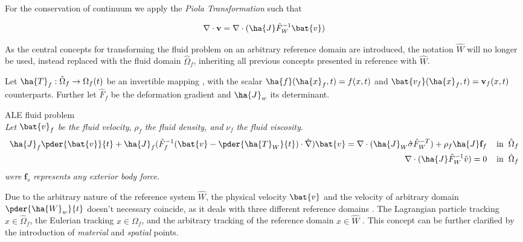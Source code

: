 For the conservation of continuum we apply the \textit{Piola Transformation} \cite{Richter2016}such that

\begin{align}
\nabla \cdot \mathbf{v} = \nabla \cdot (\ha{J} \hat{F}_W^{-1} \bat{v})
\end{align}

As the central concepts for transforming the fluid problem on an arbitrary reference domain are introduced, the notation $\hat{W}$ will no longer be used, instead replaced with the fluid domain $\hat{\Omega}_f$, inheriting all previous concepts presented in reference with $\hat{W}$.

 Let $\ha{T}_f : \hat{\Omega}_f \rightarrow \Omega_f (t)$ be an  invertible mapping , with the scalar $\ha{f}(\ha{x}_f, t) = f(x,t) $ and $\bat{v_f}(\ha{x}_f, t) = \mathbf{v}_f (x,t) $ counterparts. Further let $\hat{F}_f$ be the deformation gradient and  $\ha{J}_w$ its determinant.

\begin{equat}
ALE fluid problem \\ 
\textit{Let } $\bat{v}_f$ \textit{be the fluid velocity}, $\rho_f$  \textit{the fluid density, and }  $\nu_f$  \textit{the fluid viscosity}.
\begin{align}
\ha{J}_f \pder{\bat{v}}{t} + \ha{J}_f (\hat{F}_f^{-1}(\bat{v} - \pder{\ha{T}_W}{t}) \cdot \hat{\nabla}) \bat{v}
= \nabla \cdot (\ha{J}_W \hat{\sigma}\hat{F}_W^{-T}) + \rho_f \ha{J} \mathbf{f}_f
\hspace{4mm} \text{in} \hspace{2mm} \hat{\Omega}_f \\
\nabla \cdot (\ha{J} \hat{F}_W^{-1} \hat{v}) = 0 \hspace{4mm} \text{in} \hspace{2mm} \hat{\Omega}_f 
\end{align}
\textit{were}  $\mathbf{f}_s$  \textit{represents any exterior body force.}
\end{equat}

Due to the arbitrary nature of the reference system $\hat{W}$, the physical velocity $\bat{v}$ and the velocity of arbitrary domain $\pder{\ha{W}_w}{t}$ doesn't necessary coincide, as it deals with three different reference domains \cite{Richter2016}. The Lagrangian particle tracking $x \in \hat{\Omega}_f $, the Eulerian tracking $x \in \Omega_f $, and the arbitrary tracking of the reference domain  $x \in \hat{W} $ \cite{Richter2016}. This concept can be further clarified by the introduction of \textit{material} and \textit{spatial} points. 

